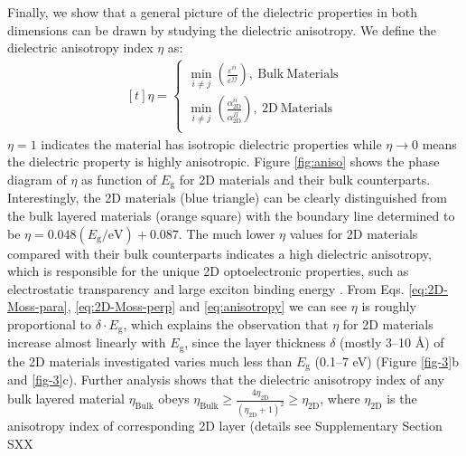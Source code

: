 \documentclass[journal=ancac3,manuscript=article,email=true,hyperref=true,keywords=false]{achemso}
\begin{document}
Finally, we show that a general picture of the dielectric properties in
both dimensions can be drawn by studying the dielectric
anisotropy. We define the dielectric anisotropy index $\eta$ as:
\begin{equation}
  \label{eq:anisotropy}
  \begin{aligned}[t]
    \eta =
    \begin{cases}
      {\displaystyle \min_{i \neq j}}
      {\displaystyle
        \left(\frac{\varepsilon^{ii}}{\varepsilon^{jj}}\right)},
      \ \mathrm{Bulk\ Materials}\\
      {\displaystyle \min_{i \neq j}}
      {\displaystyle
        \left(\frac{\alpha_{\mathrm{2D}}^{ii}}{\alpha_{\mathrm{2D}}^{jj}}\right)},
      \ \mathrm{2D\ Materials}\\
    \end{cases}
  \end{aligned}
\end{equation}
$\eta=1$ indicates the material has isotropic dielectric properties
while $\eta \to 0$ means the dielectric property is highly
anisotropic. Figure \ref{fig:aniso} shows the phase diagram of $\eta$
as function of $E_{\mathrm{g}}$ for 2D materials and their bulk
counterparts. Interestingly, the 2D materials (blue triangle) can be
clearly distinguished from the bulk layered materials (orange square)
with the boundary line determined to be
$\eta =0.048 (E_{\mathrm{g}}/ \mathrm{eV})+0.087$. The much lower
$\eta$ values for 2D materials compared with their bulk counterparts
indicates a high dielectric anisotropy, which is responsible for the
unique 2D optoelectronic properties, such as electrostatic
transparency \cite{Liluhua_2014,Tian_2016,Li_2018} and large exciton
binding energy
\cite{Pulci_2014,Tran_2014,Chernikov_2014_EB_MoS2_2D3D,Berkelbach_2013}. From
Eqs. \ref{eq:2D-Moss-para}, \ref{eq:2D-Moss-perp} and
\ref{eq:anisotropy} we can see $\eta$ is roughly proportional to
$\delta \cdot E_{\mathrm{g}}$, which explains the observation that
$\eta$ for 2D materials increase almost linearly with
$E_{\mathrm{g}}$, since the layer thickness $\delta$ (mostly 3--10
\AA{}) of the 2D materials investigated varies much less than
$E_{\mathrm{g}}$ (0.1--7 eV) (Figure \ref{fig-3}b and
\ref{fig-3}c). Further analysis shows that the dielectric anisotropy
index of any bulk layered material $\eta_{\mathrm{Bulk}}$ obeys
$\eta_{\mathrm{Bulk}} \geq {\displaystyle \frac{4
    \eta_{\mathrm{2D}}}{(\eta_{\mathrm{2D}}+1)^{2}}} \geq
\eta_{\mathrm{2D}}$, where $\eta_{\mathrm{2D}}$ is the anisotropy index
of corresponding 2D layer (details see Supplementary Section SXX
\end{document}
